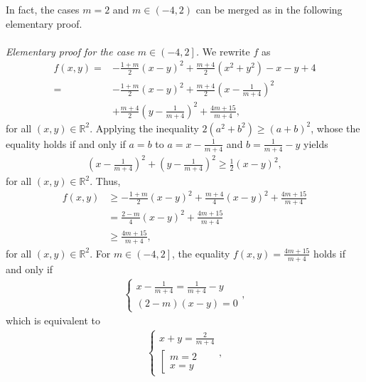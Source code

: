 \documentclass[a4paper]{article}
\numberwithin{equation}{section}
\begin{document}
In fact, the cases $m=2$ and $m\in \left(-4,2\right)$ can be merged as in the following elementary proof.\\
\\
\textit{Elementary proof for the case $m\in \left(-4,2\right]$.} We rewrite $f$ as
\begin{align}
f\left( {x,y} \right) =&  - \frac{{1 + m}}{2}{\left( {x - y} \right)^2} + \frac{{m + 4}}{2}\left( {{x^2} + {y^2}} \right) - x - y + 4\\
 =&  - \frac{{1 + m}}{2}{\left( {x - y} \right)^2} + \frac{{m + 4}}{2}{\left( {x - \frac{1}{{m + 4}}} \right)^2}\\
 &+ \frac{{m + 4}}{2}{\left( {y - \frac{1}{{m + 4}}} \right)^2} + \frac{{4m + 15}}{{m + 4}},
\end{align}
for all $\left(x,y\right)\in \mathbb{R}^2$. Applying the inequality $2\left(a^2+b^2\right) \ge \left(a+b\right)^2$, whose the equality holds if and only if $a=b$ to $a={x - \frac{1}{{m + 4}}}$ and $b={ \frac{1}{{m + 4}}-y}$ yields
\begin{align}
{\left( {x - \frac{1}{{m + 4}}} \right)^2} + {\left( {y - \frac{1}{{m + 4}}} \right)^2} \ge \frac{1}{2}{\left( {x - y} \right)^2},
\end{align}
for all $\left( {x,y} \right) \in {\mathbb{R}^2}$. Thus,
\begin{align}
f\left( {x,y} \right) &\ge  - \frac{{1 + m}}{2}{\left( {x - y} \right)^2} + \frac{{m + 4}}{4}{\left( {x - y} \right)^2} + \frac{{4m + 15}}{{m + 4}}\\
 &= \frac{{2 - m}}{4}{\left( {x - y} \right)^2} + \frac{{4m + 15}}{{m + 4}}\\
& \ge \frac{{4m + 15}}{{m + 4}},
\end{align}
for all $\left( {x,y} \right) \in {\mathbb{R}^2}$. For $m\in \left(-4,2\right]$, the equality $f\left( {x,y} \right) = \frac{{4m + 15}}{{m + 4}}$ holds if and only if 
\begin{align}
\left\{ {\begin{array}{*{20}{c}}
{x - \frac{1}{{m + 4}} = \frac{1}{{m + 4}} - y}\\
{\left( {2 - m} \right)\left( {x - y} \right) = 0}
\end{array}} \right. ,
\end{align}
which is equivalent to
\begin{align}
\left\{ {\begin{array}{*{20}{c}}
{x + y = \frac{2}{{m + 4}}}\\
{\left[ {\begin{array}{*{20}{c}}
{m = 2}\\
{x = y}
\end{array}} \right.}
\end{array}} \right. ,
\end{align}
\end{document}
